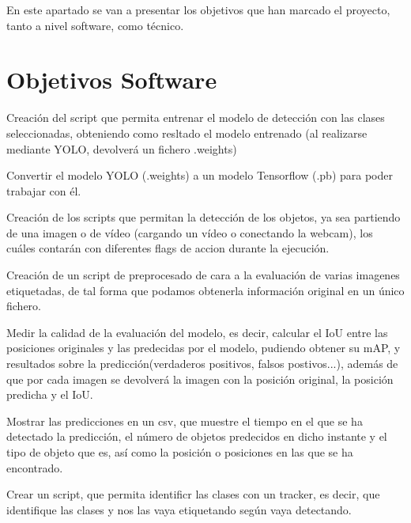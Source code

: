 
En este apartado se van a presentar los objetivos que han marcado el proyecto, tanto a nivel software, como técnico.

\section{Objetivos Software}
\begin{list}{\textbullet}{ %
    \addtolength{\itemsep}{-2mm} %
    \setlength{\itemindent}{2mm}}

    \item Creación del script que permita entrenar el modelo de detección con las clases seleccionadas, obteniendo como resltado el modelo entrenado (al realizarse mediante YOLO, devolverá un fichero .weights)
    \item Convertir el modelo YOLO (.weights) a un modelo Tensorflow (.pb) para poder trabajar con él.
    \item Creación de los scripts que permitan la detección de los objetos, ya sea partiendo de una imagen o de vídeo (cargando un vídeo o conectando la webcam), los cuáles contarán con diferentes flags de accion durante la ejecución.
    \item Creación de un script de preprocesado de cara a la evaluación de varias imagenes etiquetadas, de tal forma que podamos obtenerla información original en un único fichero.
    \item Medir la calidad de la evaluación del modelo, es decir, calcular el IoU entre las posiciones originales y las predecidas por el modelo, pudiendo obtener su mAP, y resultados sobre la predicción(verdaderos positivos, falsos postivos...), además de que por cada imagen se devolverá la imagen con la posición original, la posición predicha y el IoU.
    \item Mostrar las predicciones en un csv, que muestre el tiempo en el que se ha detectado la predicción, el número de objetos predecidos en dicho instante y el tipo de objeto que es, así como la posición o posiciones en las que se ha encontrado.
    \item Crear un script, que permita identificr las clases con un tracker, es decir, que identifique las clases y nos las vaya etiquetando según vaya detectando.
\end{list}

